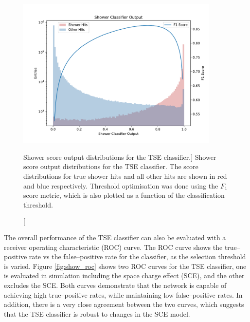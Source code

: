 \begin{figure}
	\centering
	\includegraphics[width=0.9\textwidth]{figures/shower_combined.pdf} 
	\caption
	[Shower score output distributions for the TSE classifier.]
	{Shower score output distributions for the TSE classifier. The score
	distributions for true shower hits and all other hits are shown in red and
	blue respectively. Threshold optimisation was done using the $F_1$ score 
	metric, which is also plotted as a function of the classification threshold.}
	\label{fig:show_output}
\end{figure}

The overall performance of the TSE classifier can also be evaluated with a
receiver operating characteristic (ROC) curve\cite{Fawcett2006}. The ROC curve
shows the true--positive rate vs the false--positive rate for the classifier, as
the selection threshold is varied. Figure \ref{fig:show_roc} shows two ROC
curves for the TSE classifier, one is evaluated in simulation including
the space charge effect (SCE), and the other excludes the SCE. Both curves
demonstrate that the network is capable of achieving high true--positive rates,
while maintaining low false--positive rates. In addition, there is a very close
agreement between the two curves, which suggests that the TSE classifier is
robust to changes in the SCE model.

